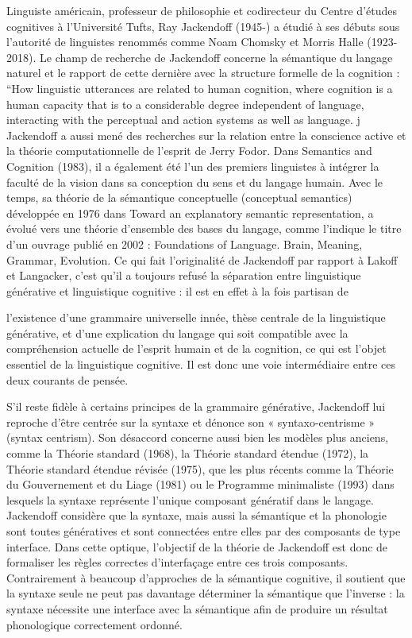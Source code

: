 Linguiste américain, professeur de philosophie et codirecteur du Centre d’études cognitives à l’Université Tufts, Ray Jackendoff (1945-) a étudié à ses débuts sous l'autorité de linguistes renommés comme Noam Chomsky et Morris Halle (1923-2018). Le champ de recherche de Jackendoff concerne la sémantique du langage naturel et le rapport de cette dernière avec la structure formelle de la cognition : “How linguistic utterances are related to human cognition, where cognition is a human capacity that is to a considerable degree independent of language, interacting with the perceptual and action systems as well as language. j Jackendoff a aussi mené des recherches sur la relation entre la conscience active et la théorie computationnelle de l’esprit de Jerry Fodor. Dans Semantics and Cognition (1983), il a également été l’un des premiers linguistes à intégrer la faculté de la vision dans sa conception du sens et du langage humain. Avec le temps, sa théorie de la sémantique conceptuelle (conceptual semantics) développée en 1976 dans Toward an explanatory semantic representation, a évolué vers une théorie d'ensemble des bases du langage, comme l'indique le titre d’un ouvrage publié en 2002 : Foundations of Language. Brain, Meaning, Grammar, Evolution. Ce qui fait l'originalité de Jackendoff par rapport à Lakoff et Langacker, c’est qu’il a toujours refusé la séparation entre linguistique générative et linguistique cognitive : il est en effet à la fois partisan de\par


l'existence d’une grammaire universelle innée, thèse centrale de la linguistique générative, et d’une explication du langage qui soit compatible avec la compréhension actuelle de l’esprit humain et de la cognition, ce qui est l’objet essentiel de la linguistique cognitive. Il est donc une voie intermédiaire entre ces deux courants de pensée.\par

 S’il reste fidèle à certains principes de la grammaire générative, Jackendoff lui reproche d’être centrée sur la syntaxe et dénonce son « syntaxo-centrisme » (syntax centrism). Son désaccord concerne aussi bien les modèles plus anciens, comme la Théorie standard (1968), la Théorie standard étendue (1972), la Théorie standard étendue révisée (1975), que les plus récents comme la Théorie du Gouvernement et du Liage (1981) ou le Programme minimaliste (1993) dans lesquels la syntaxe représente l'unique composant génératif dans le langage. Jackendoff considère que la syntaxe, mais aussi la sémantique et la phonologie sont toutes génératives et sont connectées entre elles par des composants de type interface. Dans cette optique, l'objectif de la théorie de Jackendoff est donc de formaliser les règles correctes d’interfaçage entre ces trois composants. Contrairement à beaucoup d’approches de la sémantique cognitive, il soutient que la syntaxe seule ne peut pas davantage déterminer la sémantique que l'inverse : la syntaxe nécessite une interface avec la sémantique afin de produire un résultat phonologique correctement ordonné.\par


